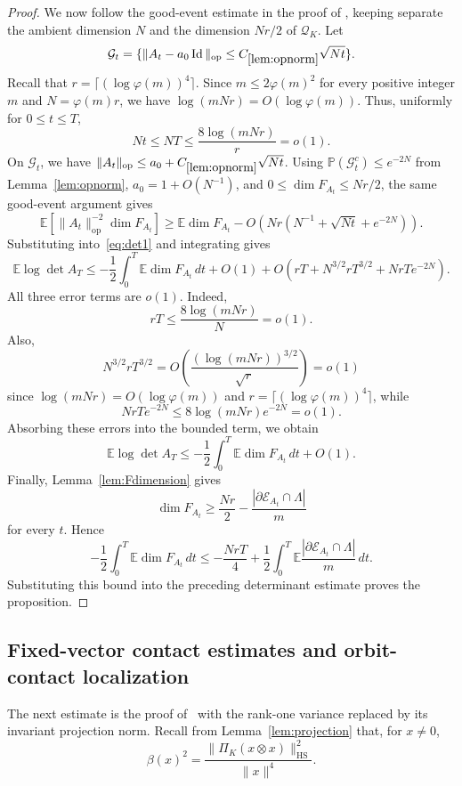 \documentclass[11pt]{article}
\theoremstyle{remark}
\newcommand{\Id}{\operatorname{Id}}
\newcommand{\E}{\mathbb E}
\newcommand{\Prob}{\mathbb P}
\newcommand{\HS}{\operatorname{HS}}
\newcommand{\op}{\operatorname{op}}
\newcommand{\calE}{\mathcal E}
\begin{document}
\begin{proof}
We now follow the good-event estimate in the proof of
\cite[Proposition~3.4]{Klartag}, keeping separate the ambient dimension $N$
and the dimension $Nr/2$ of $\mathcal Q_K$.  Let
\[
        \mathcal G_t=\{\|A_t-a_0\Id\|_{\op}\le
        C_{\ref{lem:opnorm}}\sqrt{Nt}\}.
\]
Recall that $r=\lceil(\log\varphi(m))^4\rceil$.
Since $m\le2\varphi(m)^2$ for every positive integer $m$ and
$N=\varphi(m)r$, we have $\log(mNr)=O(\log\varphi(m))$.  Thus, uniformly
for $0\le t\le T$,
\[
        Nt\le NT\le\frac{8\log(mNr)}r=o(1).
\]
On $\mathcal G_t$, we have
$\|A_t\|_{\op}\le a_0+C_{\ref{lem:opnorm}}\sqrt{Nt}$.
Using $\Prob(\mathcal G_t^c)\le e^{-2N}$ from Lemma~\ref{lem:opnorm},
$a_0=1+O(N^{-1})$, and $0\le\dim F_{A_t}\le Nr/2$, the same good-event argument
gives
\[
        \E[\|A_t\|_{\op}^{-2}\dim F_{A_t}]
        \ge \E\dim F_{A_t}-O\left(Nr(N^{-1}+\sqrt{Nt}+e^{-2N})\right).
\]
Substituting into~\eqref{eq:det1} and integrating gives
\[
        \E\log\det A_T
        \le -\frac12\int_0^T\E\dim F_{A_t}\,dt+O(1)
        +O\left(rT+N^{3/2}rT^{3/2}+NrTe^{-2N}\right).
\]
All three error terms are $o(1)$.  Indeed,
\[
        rT\le\frac{8\log(mNr)}{N}=o(1).
\]
Also,
\[
        N^{3/2}rT^{3/2}
        =O\left(\frac{(\log(mNr))^{3/2}}{\sqrt r}\right)=o(1)
\]
since $\log(mNr)=O(\log\varphi(m))$ and
$r=\lceil(\log\varphi(m))^4\rceil$, while
\[
        NrTe^{-2N}\le8\log(mNr)e^{-2N}=o(1).
\]
Absorbing these errors into the bounded term,
we obtain
\[
        \E\log\det A_T
        \le -\frac12\int_0^T\E\dim F_{A_t}\,dt+O(1).
\]
Finally, Lemma~\ref{lem:Fdimension} gives
\[
        \dim F_{A_t}\ge
        \frac{Nr}{2}-\frac{|\partial\calE_{A_t}\cap\Lambda|}{m}
\]
for every $t$.  Hence
\[
        -\frac12\int_0^T\E\dim F_{A_t}\,dt
        \le -\frac{NrT}{4}+\frac12\int_0^T\E
        \frac{|\partial\calE_{A_t}\cap\Lambda|}{m}\,dt.
\]
Substituting this bound into the preceding determinant estimate proves the proposition.
\end{proof}

\subsection{Fixed-vector contact estimates and orbit-contact localization}

The next estimate is the proof of~\cite[Proposition~4.1]{Klartag} with the
rank-one variance replaced by its invariant projection norm.
Recall from Lemma~\ref{lem:projection} that, for $x\ne0$,
\[
        \beta(x)^2
        =\frac{\|\Pi_K(x\otimes x)\|_{\HS}^2}{\|x\|^4}.
\]
\end{document}
